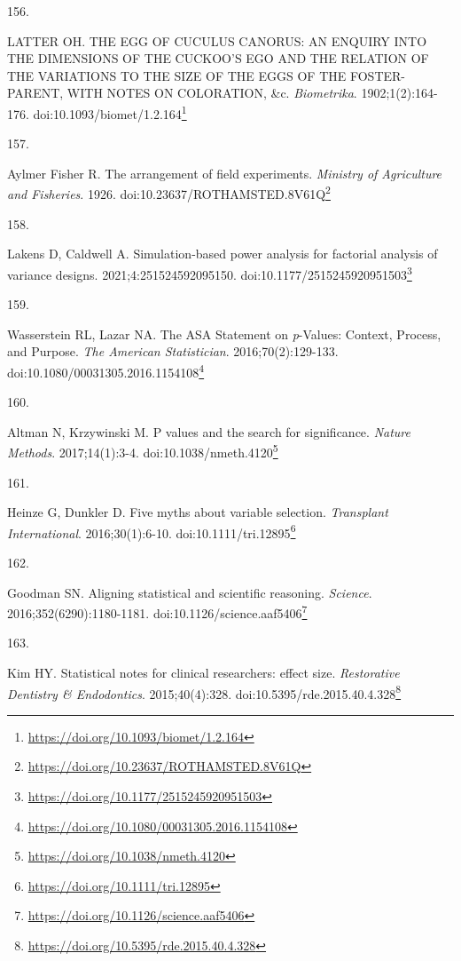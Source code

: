 \documentclass[
  a4paper,
]{book}
\newlength{\cslhangindent}
\newlength{\csllabelwidth}
\newlength{\cslentryspacingunit} %
\newenvironment{CSLReferences}[2] %
 {%
  \setlength{\parindent}{0pt}
  \ifodd #1
  \let\oldpar\par
  \def\par{\hangindent=\cslhangindent\oldpar}
  \fi
  \setlength{\parskip}{#2\cslentryspacingunit}
 }%
 {}
\newcommand{\CSLLeftMargin}[1]{\parbox[t]{\csllabelwidth}{#1}}
\newcommand{\CSLRightInline}[1]{\parbox[t]{\linewidth - \csllabelwidth}{#1}\break}
\renewcommand{\href}[2]{#2\footnote{\url{#1}}}
\begin{document}
\begin{CSLReferences}{0}{0}
\leavevmode{}%
\CSLLeftMargin{156. }%
\CSLRightInline{LATTER OH. THE EGG OF CUCULUS CANORUS: AN ENQUIRY INTO THE DIMENSIONS OF THE CUCKOO'S EGO AND THE RELATION OF THE VARIATIONS TO THE SIZE OF THE EGGS OF THE FOSTER-PARENT, WITH NOTES ON COLORATION, \&c. \emph{Biometrika}. 1902;1(2):164-176. doi:\href{https://doi.org/10.1093/biomet/1.2.164}{10.1093/biomet/1.2.164}}

\leavevmode{}%
\CSLLeftMargin{157. }%
\CSLRightInline{Aylmer Fisher R. The arrangement of field experiments. \emph{Ministry of Agriculture and Fisheries}. 1926. doi:\href{https://doi.org/10.23637/ROTHAMSTED.8V61Q}{10.23637/ROTHAMSTED.8V61Q}}

\leavevmode{}%
\CSLLeftMargin{158. }%
\CSLRightInline{Lakens D, Caldwell A. Simulation-based power analysis for factorial analysis of variance designs. 2021;4:251524592095150. doi:\href{https://doi.org/10.1177/2515245920951503}{10.1177/2515245920951503}}

\leavevmode{}%
\CSLLeftMargin{159. }%
\CSLRightInline{Wasserstein RL, Lazar NA. The ASA Statement on {\emph{p}}-Values: Context, Process, and Purpose. \emph{The American Statistician}. 2016;70(2):129-133. doi:\href{https://doi.org/10.1080/00031305.2016.1154108}{10.1080/00031305.2016.1154108}}

\leavevmode{}%
\CSLLeftMargin{160. }%
\CSLRightInline{Altman N, Krzywinski M. P values and the search for significance. \emph{Nature Methods}. 2017;14(1):3-4. doi:\href{https://doi.org/10.1038/nmeth.4120}{10.1038/nmeth.4120}}

\leavevmode{}%
\CSLLeftMargin{161. }%
\CSLRightInline{Heinze G, Dunkler D. Five myths about variable selection. \emph{Transplant International}. 2016;30(1):6-10. doi:\href{https://doi.org/10.1111/tri.12895}{10.1111/tri.12895}}

\leavevmode{}%
\CSLLeftMargin{162. }%
\CSLRightInline{Goodman SN. Aligning statistical and scientific reasoning. \emph{Science}. 2016;352(6290):1180-1181. doi:\href{https://doi.org/10.1126/science.aaf5406}{10.1126/science.aaf5406}}

\leavevmode{}%
\CSLLeftMargin{163. }%
\CSLRightInline{Kim HY. Statistical notes for clinical researchers: effect size. \emph{Restorative Dentistry \& Endodontics}. 2015;40(4):328. doi:\href{https://doi.org/10.5395/rde.2015.40.4.328}{10.5395/rde.2015.40.4.328}}


\end{CSLReferences}
\end{document}
